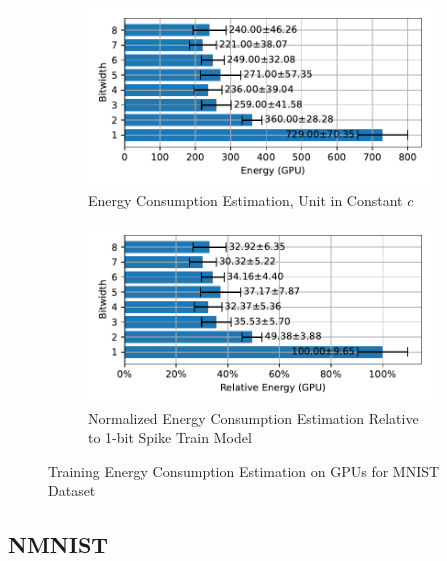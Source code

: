         \begin{figure}[H]
            \centering
            \begin{subfigure}[H]{0.6\textwidth}
                \includegraphics[width=\textwidth]{../standard/MNIST/plots/mnist_train_energy_gpu_horizontal.pdf}
                \caption{Energy Consumption Estimation, Unit in Constant $c$}
            \end{subfigure}
            \hfill
            \begin{subfigure}[H]{0.6\textwidth}
                \includegraphics[width=\textwidth]{../standard/MNIST/plots/mnist_train_relative_energy_gpu_horizontal.pdf}
                \caption{Normalized Energy Consumption Estimation Relative to 1-bit Spike Train Model}
            \end{subfigure}
            \caption{Training Energy Consumption Estimation on GPUs for MNIST Dataset}
        \end{figure}

    \subsection{NMNIST}
    \label{appendix:energy_gpu_nmnist}


